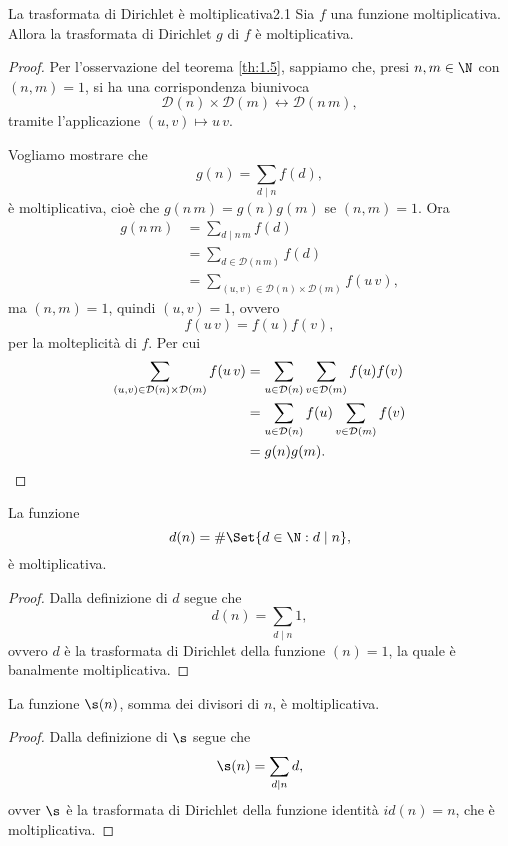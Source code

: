 \begin{teor}{La trasformata di Dirichlet è moltiplicativa}{2.1}
	Sia \(f\) una funzione moltiplicativa.
	Allora la trasformata di Dirichlet \(g\) di \(f\) è moltiplicativa.
\end{teor}

\begin{proof}
	Per l'osservazione del teorema \ref{th:1.5}, sappiamo che, presi \(n,m\in\N\) con \((n,m)=1\), si ha una corrispondenza biunivoca
	\[
		\mathcal{D}(n)\times\mathcal{D}(m)\longleftrightarrow\mathcal{D}(n\,m),
	\]
	tramite l'applicazione \((u,v)\mapsto u\,v\).

	Vogliamo mostrare che
	\[
		g(n)=\sum_{d\mid n}f(d),
	\]
	è moltiplicativa, cioè che \(g(n\,m)=g(n)g(m)\) se \((n,m)=1\).
	Ora
	\[
		\begin{split}
			g(n\,m) & =\sum_{d\mid n\,m}f(d)\\
			& =\sum_{d\in\mathcal{D}(n\,m)} f(d)\\
			& = \sum_{(u,v)\in\mathcal{D}(n)\times\mathcal{D}(m)} f(u\,v),
		\end{split}
	\]
	ma \((n,m)=1\), quindi \((u,v)=1\), ovvero
	\[
		f(u\,v)=f(u)f(v),
	\]
	per la molteplicità di \(f\).
	Per cui
	\[
		\begin{split}
			\sum_{(u,v)\in\mathcal{D}(n)\times\mathcal{D}(m)} f(u\,v) & =\sum_{u\in\mathcal{D}(n)}\sum_{v\in\mathcal{D}(m)}f(u)f(v)\\
			& =\sum_{u\in\mathcal{D}(n)}f(u)\sum_{v\in\mathcal{D}(m)}f(v)\\
			& =g(n)g(m).\qedhere
		\end{split}
	\]
\end{proof}

\begin{cor}
	La funzione
	\[
		d(n)=\#\Set{d\in\N:d\mid n},
	\]
	è moltiplicativa.
\end{cor}

\begin{proof}
	Dalla definizione di \(d\) segue che
	\[
		d(n)=\sum_{d\mid n}1,
	\]
	ovvero \(d\) è la trasformata di Dirichlet della funzione \((n)=1\), la quale è banalmente moltiplicativa.
\end{proof}

\begin{cor}
	La funzione \(\s(n)\), somma dei divisori di \(n\), è moltiplicativa.
\end{cor}

\begin{proof}
	Dalla definizione di \(\s\) segue che
	\[
		\s(n)=\sum_{d\mid n} d,
	\]
	ovver \(\s\) è la trasformata di Dirichlet della funzione identità \(id(n)=n\), che è moltiplicativa.
\end{proof}

